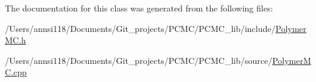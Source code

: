 The documentation for this class was generated from the following files\+:\begin{DoxyCompactItemize}
\item 
/\+Users/annsi118/\+Documents/\+Git\+\_\+projects/\+P\+C\+M\+C/\+P\+C\+M\+C\+\_\+lib/include/\hyperlink{_polymer_m_c_8h}{Polymer\+M\+C.\+h}\item 
/\+Users/annsi118/\+Documents/\+Git\+\_\+projects/\+P\+C\+M\+C/\+P\+C\+M\+C\+\_\+lib/source/\hyperlink{_polymer_m_c_8cpp}{Polymer\+M\+C.\+cpp}\end{DoxyCompactItemize}
